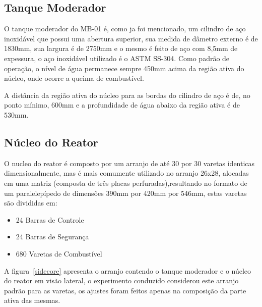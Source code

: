 \documentclass[
	12pt,				%
	openany,			%
	twoside,			%
	a4paper,			%
	english,			%
	french,				%
	spanish,			%
	brazil				%
	]{abntex2}
\begin{document}
\subsection{Tanque Moderador}

O tanque moderador do MB-01 é, como ja foi mencionado, um cilindro
de aço inoxidável que possui uma abertura superior, sua medida de
dâmetro externo é de 1830mm, sua largura é de 2750mm e o mesmo é feito
de aço com 8,5mm de expessura, o aço inoxidável utilizado é o ASTM
SS-304. Como padrão de operação, o nível de água permanece sempre
450mm acima da região ativa do núcleo, onde ocorre a queima de combustível.

A distância da região ativa do núcleo para as bordas do cilindro de aço é de, no ponto mínimo, 600mm e a profundidade de água abaixo da região ativa é de 530mm. 

\subsection{Núcleo do Reator}

O nucleo do reator é composto por um arranjo de até 30 por 30 varetas identicas dimensionalmente, mas é mais comumente utilizado no arranjo 26x28, alocadas em uma matriz (composta de três placas perfuradas),resultando no formato de um paralelepípedo de dimensões 390mm por 420mm por 546mm, estas varetas são divididas em:
\begin{itemize}
\item 24 Barras de Controle
\item 24 Barras de Segurança
\item 680 Varetas de Combustível
\end{itemize}
A figura~\ref{sidecore} apresenta o arranjo contendo o tanque moderador e o núcleo do reator em visão lateral, o experimento conduzido considerou este arranjo padrão para as varetas, os ajustes foram feitos apenas na composição da parte ativa das mesmas.
\end{document}
